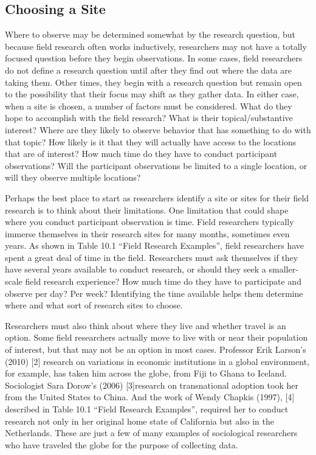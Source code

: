 \subsection{Choosing a Site}

Where to observe may be determined somewhat by the research question, but because field research often works inductively, researchers may not have a totally focused question before they begin observations. In some cases, field researchers do not define a research question until after they find out where the data are taking them. Other times, they begin with a research question but remain open to the possibility that their focus may shift as they gather data. In either case, when a site is chosen, a number of factors must be considered. What do they hope to accomplish with the field research? What is their topical/substantive interest? Where are they likely to observe behavior that has something to do with that topic? How likely is it that they will actually have access to the locations that are of interest? How much time do they have to conduct participant observations? Will the participant observations be limited to a single location, or will they observe multiple locations?

Perhaps the best place to start as researchers identify a site or sites for their field research is to think about their limitations. One limitation that could shape where you conduct participant observation is time. Field researchers typically immerse themselves in their research sites for many months, sometimes even years. As shown in Table 10.1 ``Field Research Examples'', field researchers have spent a great deal of time in the field. Researchers must ask themselves if they have several years available to conduct research, or should they seek a smaller-scale field research experience? How much time do they have to participate and observe per day? Per week? Identifying the time available helps them determine where and what sort of research sites to choose.


Researchers must also think about where they live and whether travel is an option. Some field researchers actually move to live with or near their population of interest, but that may not be an option in most cases. Professor Erik Larson’s (2010) [2] research on variations in economic institutions in a global environment, for example, has taken him across the globe, from Fiji to Ghana to Iceland. Sociologist Sara Dorow’s (2006) [3]research on transnational adoption took her from the United States to China. And the work of Wendy Chapkis (1997), [4] described in Table 10.1 ``Field Research Examples'', required her to conduct research not only in her original home state of California but also in the Netherlands. These are just a few of many examples of sociological researchers who have traveled the globe for the purpose of collecting data. 

